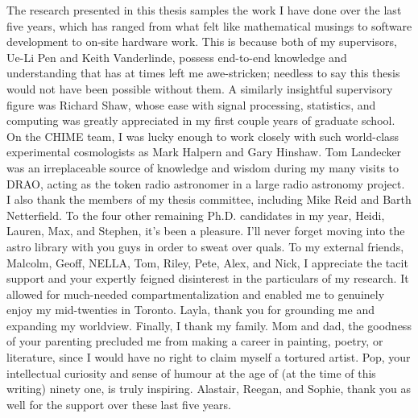 \documentclass[12pt]{ut-thesis}
\begin{document}
\begin{preliminary}
\begin{acknowledgements}
   The research presented in this thesis samples the work 
   I have done over the last five years, which has 
   ranged from what felt like mathematical musings to software development  
   to on-site hardware work. This is because both of my supervisors, 
   Ue-Li Pen and Keith Vanderlinde, possess end-to-end knowledge 
   and understanding that has at times left me awe-stricken; 
   needless to say this thesis would not have been possible without them. 
   A similarly insightful supervisory figure was Richard Shaw, 
   whose ease with signal processing, statistics, and computing 
   was greatly appreciated in my first couple years of graduate school. 
   On the CHIME team, I was lucky enough to work closely 
   with such world-class experimental cosmologists as Mark Halpern 
   and Gary Hinshaw. Tom Landecker was an irreplaceable source 
   of knowledge and wisdom during my many 
   visits to DRAO, acting as the token radio astronomer in a 
   large radio astronomy project. I also thank the members of my 
   thesis committee, including Mike Reid and Barth Netterfield. 
   To the four other remaining Ph.D. candidates in my year,
   Heidi, Lauren, Max, and Stephen, it's been a pleasure. I'll 
   never forget moving into the astro library with you guys 
   in order to sweat over quals. To my external friends, Malcolm,
   Geoff, NELLA, Tom, Riley, Pete, Alex, and Nick, I appreciate the tacit 
   support and your expertly feigned disinterest in the particulars 
   of my research. It allowed for much-needed compartmentalization 
   and enabled me to genuinely enjoy my mid-twenties in Toronto. 
   Layla, thank you for grounding me and expanding my worldview.
   Finally, I thank my family. Mom and dad, the goodness of your 
   parenting precluded me from 
   making a career in painting, poetry, or literature, since I 
   would have no right to claim myself a tortured artist. Pop, 
   your intellectual curiosity and sense of humour 
   at the age of (at the time of this writing) ninety one, 
   is truly inspiring. Alastair, Reegan, and Sophie, thank you 
   as well for the support over these last five years.
\end{acknowledgements}



\end{preliminary}
\end{document}
